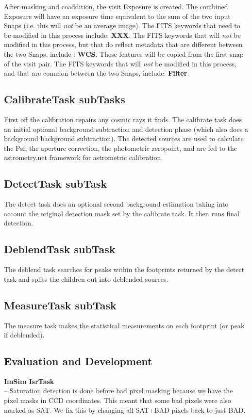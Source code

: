 \documentclass[prd, nofootinbib, floatfix, 11pt,tightenlines,times]{article}
\begin{document}
After masking and coaddition, the visit Exposure is created.  The
combined Exposure will have an exposure time equivalent to the sum of
the two input Snaps (i.e. this will {\it not} be an average image).
The FITS keywords that need to be modified in this process include:
{\bf XXX}.  The FITS keywords that will {\it not} be modified in this
process, but that do reflect metadata that are different between the
two Snaps, include : {\bf WCS}.  These features will be copied from
the first snap of the visit pair.  The FITS keywords that will {\it
  not} be modified in this process, and that are common between the
two Snaps, include: {\bf Filter}.

\subsection{CalibrateTask subTasks} 
First off the calibration repairs any cosmic rays it finds.
The calibrate task does an initial optional background subtraction and detection phase (which also does a background background subtraction).  The detected sources are used to calculate
the Psf, the aperture correction, the photometric zeropoint, and are fed to the astrometry.net framework for astrometric
calibration.

\subsection{DetectTask subTask}
The detect task does an optional second background estimation taking into account the original detection mask set by the calibrate task.
It then runs final detection.

\subsection{DeblendTask subTask}
The deblend task searches for peaks within the footprints returned by the detect task and splits the children out into deblended sources.

\subsection{MeasureTask subTask}
The measure task makes the statistical measurements on each footprint (or peak if deblended).

\subsection{Evaluation and Development}
{\bf ImSim IsrTask}\\
-- Saturation detection is done before bad pixel masking because we have the pixel masks in CCD coordinates.
This meant that some bad pixels were also marked as SAT.  We fix this by changing all SAT+BAD pixels back to just BAD.
\end{document}
